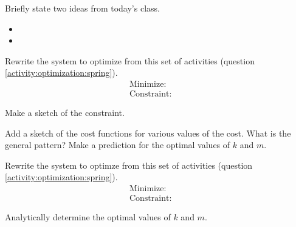 \postClass

\begin{problem}
\item Briefly state two ideas from today's class.
  \begin{itemize}
  \item
  \item
  \end{itemize}


\item Rewrite the system to optimize from this set of activities (question \ref{activity:optimization:spring}).
    \begin{eqnarray*}
      \mathrm{Minimize:} & &  \\
      \mathrm{Constraint:} & &
    \end{eqnarray*}
    \begin{subproblem}
    \item Make a sketch of the constraint.  

      \vfill

    \item Add a sketch of the cost functions for various values of the
      cost. What is the general pattern? Make a prediction for the
      optimal values of $k$ and $m$.

      \vspace{3em}
    \end{subproblem}
\clearpage

\item Rewrite the system to optimze from this set of activities (question \ref{activity:optimization:spring}).
  \begin{eqnarray*}
    \mathrm{Minimize:} & &  \\
    \mathrm{Constraint:} & &
  \end{eqnarray*}

  \begin{subproblem}
  \item Analytically determine the optimal values of $k$ and $m$.
    \vfill
  \end{subproblem}
\end{problem}


